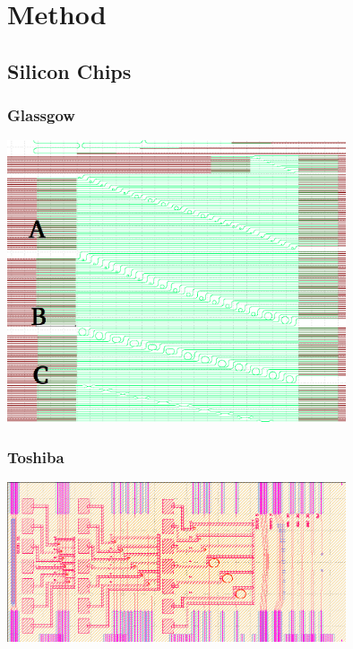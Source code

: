 \section{Method}
\subsection{Silicon Chips}
\subsubsection{Glassgow}
\begingroup
    \centering  
    \includegraphics[width=10cm]{img/method/glassgowChipNumbering.png}
     \vspace{3pt} \label{crossCompare}
\endgroup
\subsubsection{Toshiba}
\begingroup
    \centering  
    \includegraphics[width=10cm]{img/method/toshiba.png}
     \vspace{3pt} \label{crossCompare}
\endgroup
